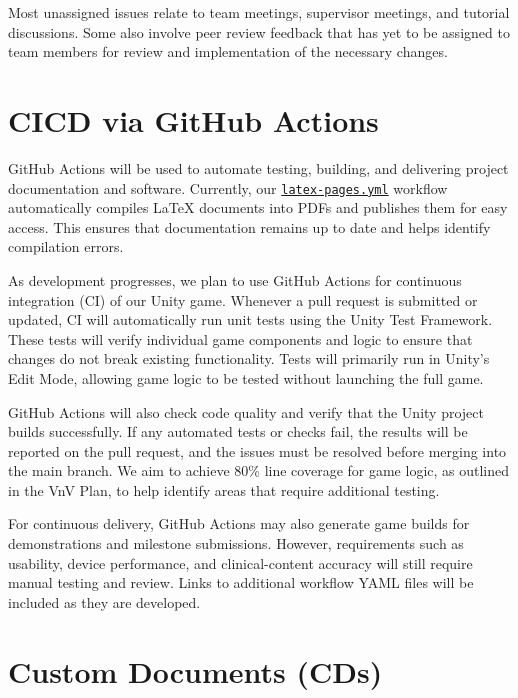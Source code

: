 \documentclass[10pt, titlepage]{article}
\begin{document}
Most unassigned issues relate to team meetings, supervisor
meetings, and tutorial discussions. Some also involve peer
review feedback that has yet to be assigned to team members
for review and implementation of the necessary changes.

\section{CICD via GitHub Actions}

GitHub Actions will be used to automate testing, building,
and delivering project documentation and software.
Currently, our
\href{https://github.com/team-hindsight/ophthamology-game/blob/main/.github/workflows/latex-pages.yml}{\texttt{latex-pages.yml}}
workflow automatically compiles LaTeX documents into PDFs
and publishes them for easy access. This ensures that
documentation remains up to date and helps identify
compilation errors.

As development progresses, we plan to use GitHub Actions
for continuous integration (CI) of our Unity game.
Whenever a pull request is submitted or updated, CI will
automatically run unit tests using the Unity Test Framework.
These tests will verify individual game components and
logic to ensure that changes do not break
existing functionality. Tests will primarily run in
Unity's Edit Mode, allowing game logic to be tested
without launching the full game.

GitHub Actions will also check code quality and verify
that the Unity project builds successfully. If any
automated tests or checks fail, the results will be
reported on the pull request, and the issues must be
resolved before merging into the main branch.
We aim to achieve 80\% line coverage for game logic,
as outlined in the VnV Plan, to help identify areas
that require additional testing. 

For continuous delivery, GitHub Actions may also generate
game builds for demonstrations and milestone submissions.
However, requirements such as usability, device
performance, and clinical-content accuracy will still
require manual testing and review. Links to additional
workflow YAML files will be included as they are developed.

\section{Custom Documents (CDs)}
\end{document}
